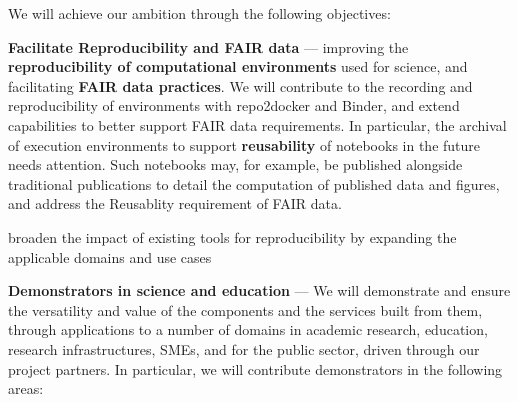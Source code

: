 






\medskip
\noindent We will achieve our ambition through the following objectives:


\begin{compactenum}

\item \label{obj:reproducibility} \textbf{Facilitate Reproducibility and FAIR data} ---
  improving the \textbf{reproducibility of computational environments}
  used for science, and facilitating \textbf{FAIR data practices}.
  We will contribute to the recording and reproducibility
  of environments with repo2docker and Binder,
  and extend capabilities to better support FAIR
  data requirements. In particular, the archival of execution
  environments to support \textbf{reusability} of notebooks in the future
  needs attention. Such notebooks may, for example, be published alongside
  traditional publications to detail the computation of published data
  and figures, and address the Reusablity requirement of FAIR data.

\item \label{obj:broaden} broaden the impact of existing tools for reproducibility by expanding the applicable domains and use cases
\item \label{obj:demonstrators}
  \textbf{Demonstrators in science and education} ---
  We will demonstrate and ensure the versatility and value of the components and
  the services built from them,
  through applications to a number of
  domains in academic research, education, research infrastructures, SMEs, and for
  the public sector, driven through our project partners. In
  particular, we will contribute demonstrators in the following areas:


\end{compactenum}
